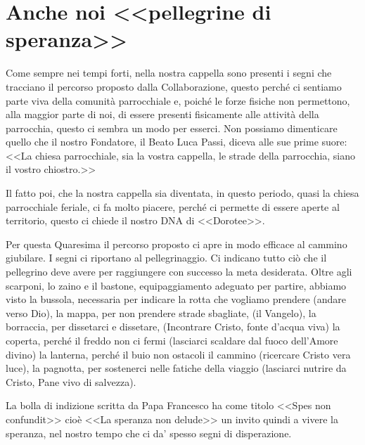 \section{Anche noi <<pellegrine di speranza>>}

Come sempre nei tempi forti, nella nostra cappella sono presenti i segni che tracciano il percorso proposto dalla Collaborazione, questo perché ci sentiamo parte viva della comunità parrocchiale e, poiché le forze fisiche non permettono, alla maggior parte di noi, di essere presenti fisicamente alle attività della parrocchia, questo ci sembra un modo per esserci. Non possiamo dimenticare quello che il nostro Fondatore, il Beato Luca Passi, diceva alle sue prime suore: <<La chiesa parrocchiale, sia la vostra cappella, le strade della parrocchia, siano il vostro chiostro.>>


Il fatto poi, che la nostra cappella sia diventata, in questo periodo, quasi la chiesa parrocchiale feriale, ci fa molto piacere, perché ci permette di essere aperte al territorio, questo ci chiede il nostro DNA di <<Dorotee>>.

Per questa Quaresima il percorso proposto ci apre in modo efficace al cammino giubilare. I segni ci riportano al pellegrinaggio. Ci indicano tutto ciò che il pellegrino deve avere per raggiungere con successo la meta desiderata. Oltre agli scarponi, lo zaino e il bastone, equipaggiamento adeguato per partire, abbiamo visto la bussola, necessaria per indicare la rotta che vogliamo prendere (andare verso Dio), la mappa, per non prendere strade sbagliate, (il Vangelo), la borraccia, per dissetarci e dissetare, (Incontrare Cristo, fonte d'acqua viva) la coperta, perché il freddo non ci fermi (lasciarci scaldare dal fuoco dell'Amore divino) la lanterna, perché il buio non ostacoli il cammino (ricercare Cristo vera luce), la pagnotta, per sostenerci nelle fatiche della viaggio (lasciarci nutrire da Cristo, Pane vivo di salvezza).

La bolla di indizione scritta da Papa Francesco ha come titolo <<Spes non confundit>> cioè <<La speranza non delude>> un invito quindi a vivere la speranza, nel nostro tempo che ci da' spesso segni di disperazione.

